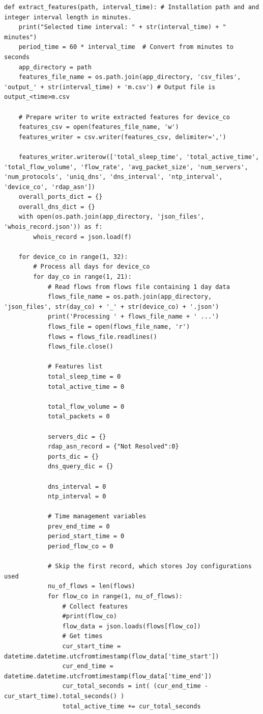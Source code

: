 \documentclass{article}
\begin{document}
\begin{appendices}
\begin{verbatim}
def extract_features(path, interval_time): # Installation path and and integer interval length in minutes.
    print("Selected time interval: " + str(interval_time) + " minutes")
    period_time = 60 * interval_time  # Convert from minutes to seconds
    app_directory = path
    features_file_name = os.path.join(app_directory, 'csv_files', 'output_' + str(interval_time) + 'm.csv') # Output file is output_<time>m.csv

    # Prepare writer to write extracted features for device_co
    features_csv = open(features_file_name, 'w')
    features_writer = csv.writer(features_csv, delimiter=',')

    features_writer.writerow(['total_sleep_time', 'total_active_time', 'total_flow_volume', 'flow_rate', 'avg_packet_size', 'num_servers', 'num_protocols', 'uniq_dns', 'dns_interval', 'ntp_interval', 'device_co', 'rdap_asn'])
    overall_ports_dict = {}
    overall_dns_dict = {}
    with open(os.path.join(app_directory, 'json_files', 'whois_record.json')) as f:
        whois_record = json.load(f)

    for device_co in range(1, 32):    
        # Process all days for device_co
        for day_co in range(1, 21):
            # Read flows from flows file containing 1 day data
            flows_file_name = os.path.join(app_directory, 'json_files', str(day_co) + '_' + str(device_co) + '.json')
            print('Processing ' + flows_file_name + ' ...')
            flows_file = open(flows_file_name, 'r')
            flows = flows_file.readlines()
            flows_file.close()

            # Features list
            total_sleep_time = 0
            total_active_time = 0

            total_flow_volume = 0
            total_packets = 0

            servers_dic = {}
            rdap_asn_record = {"Not Resolved":0}
            ports_dic = {}
            dns_query_dic = {}

            dns_interval = 0
            ntp_interval = 0
        
            # Time management variables
            prev_end_time = 0
            period_start_time = 0
            period_flow_co = 0

            # Skip the first record, which stores Joy configurations used
            nu_of_flows = len(flows)
            for flow_co in range(1, nu_of_flows):
                # Collect features
                #print(flow_co)
                flow_data = json.loads(flows[flow_co])
                # Get times
                cur_start_time = datetime.datetime.utcfromtimestamp(flow_data['time_start'])
                cur_end_time = datetime.datetime.utcfromtimestamp(flow_data['time_end'])
                cur_total_seconds = int( (cur_end_time - cur_start_time).total_seconds() )
                total_active_time += cur_total_seconds
            

\end{verbatim}
\end{appendices}
\end{document}
